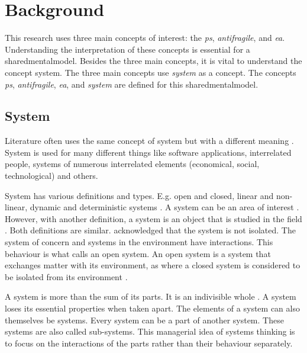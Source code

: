 \chapter{Background}
\label{ch:theoreticalbackground}
This research uses three main concepts of interest: the \textit{\gls{ps}}, \textit{\gls{antifragile}}, and \textit{\acrlong{ea}}. Understanding the interpretation of these concepts is essential for a \gls{sharedmentalmodel}. Besides the three main concepts, it is vital to understand the concept system. The three main concepts use \textit{system} as a concept. The concepts \textit{\gls{ps}}, \textit{\gls{antifragile}}, \textit{\acrlong{ea}}, and \textit{system} are defined for this \gls{sharedmentalmodel}.
\section{System}
\label{sec:tbsystem}
Literature often uses the same concept of system but with a different meaning \parencite[p.~37]{Lapalme2012}. System is used for many different things like software applications, interrelated people, systems of numerous interrelated elements (economical, social, technological) and others.

System has various definitions and types. E.g. open and closed, linear and non-linear, dynamic and deterministic systems \parencite{Rickles2007}. A system can be an area of interest \parencite[p.~13]{Mannaert2016}. However, with another definition, a system is an object that is studied in the field \parencite[p.~933]{Rickles2007}. Both definitions are similar. \Textcite[pp.~13--14]{Mannaert2016} acknowledged that the system is not isolated. The system of concern and systems in the environment have interactions. This behaviour is what \textcite[p.~32]{Bertalanffy1968} calls an open system. An open system is a system that exchanges matter with its environment, as where a closed system is considered to be isolated from its environment \parencite[p.~39]{Bertalanffy1968}.

A system is more than the sum of its parts. It is an indivisible whole \parencites[p.~51--69]{Ackoff1964}[p.~664]{Ackoff1973}. A system loses its essential properties when taken apart. The elements of a system can also themselves be systems. Every system can be a part of another system. These systems are also called sub-systems. This managerial idea of systems thinking is to focus on the interactions of the parts rather than their behaviour separately. 

